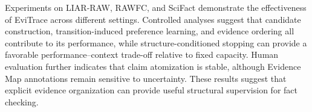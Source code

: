 \documentclass[letterpaper]{article}
\begin{document}
Experiments on LIAR-RAW, RAWFC, and SciFact demonstrate the effectiveness
of EviTrace across different settings. Controlled analyses suggest that
candidate construction, transition-induced preference learning, and
evidence ordering all contribute to its performance, while
structure-conditioned stopping can provide a favorable
performance--context trade-off relative to fixed capacity. Human
evaluation further indicates that claim atomization is stable, although
Evidence Map annotations remain sensitive to uncertainty. These results
suggest that explicit evidence organization can provide useful
structural supervision for fact checking. 


\end{document}
